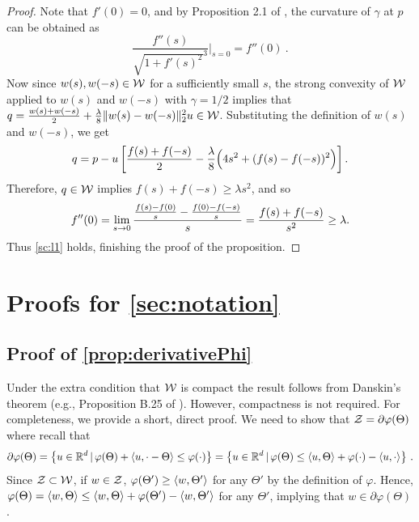 \begin{proof}
Note that $f'(0)=0$, and by Proposition 2.1 of \citet{pressley2010elementary}, the curvature of $\gamma$ at $p$ can be obtained as 
\[
\frac{f''(s)}{\sqrt{1+f'(s)^2}^3}\Bigg\vert_{s=0} = f''(0)~.
\]
Now since $w(s),w(-s) \in \mathcal{W}$ for a sufficiently small $s$, the strong convexity of $\mathcal{W}$ applied to $w(s)$ and $w(-s)$ with $\gamma=1/2$
implies that $q=\frac{w(s)+w(-s)}{2}+\frac{\lambda}{8} \|w(s)-w(-s)\|_2^2 u \in \mathcal{W}$. Substituting the definition of $w(s)$ and $w(-s)$, we get
\[
q=p - u \left[\frac{f(s)+f(-s)}{2} - \frac{\lambda}{8} \Bigl(4s^2 + (f(s)-f(-s))^2\Bigr)\right].
\]
Therefore, $q \in \mathcal{W}$ implies
$f(s)+f(-s) \ge \lambda s^2$, and so
\[
	f''(0) = \lim_{s \rightarrow 0} \frac{\frac{f(s) - f(0)}{s} - \frac{f(0) - f(-s)}{s}}{s} = \frac{f(s)+ f(-s)}{s^2} \ge \lambda.
\]
Thus \eqref{sc:l1} holds, finishing the proof of the proposition.
\end{proof}



\section{Proofs for \cref{sec:notation}}
\subsection{Proof of \cref{prop:derivativePhi}}
Under the extra condition that $\mathcal{W}$ is compact
the result follows from Danskin's theorem (e.g., Proposition B.25 of \citealt{bertsekas99nonlinear}).
However, compactness is not required. 
For completeness, we provide a short, direct proof. 
We need to show that 
$\mathcal{Z} = \partial \varphi(\Theta)$ where recall that
\begin{align*}
\partial \varphi(\Theta)= \left\{u\in \mathbb{R}^d \,\vert\,  \varphi(\Theta) + \langle u, \cdot-\Theta\rangle \le \varphi(\cdot) \right\}
= \left\{u\in  \mathbb{R}^d \,\vert\,  \varphi(\Theta)  \le \langle u, \Theta\rangle + \varphi(\cdot) - \langle u, \cdot\rangle  \right\}\,.
\end{align*}
Since $\mathcal{Z} \subset \mathcal{W}$, 
if $w\in \mathcal{Z}$, $\varphi(\Theta') \ge \langle w,\Theta'\rangle$ for any $\Theta'$ by the definition of $\varphi$.
Hence, $\varphi(\Theta) = \langle w,\Theta\rangle \le \langle w,\Theta\rangle + \varphi(\Theta')-\langle w,\Theta'\rangle$ for any $\Theta'$, implying that $w\in \partial \varphi(\Theta)$.

